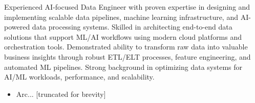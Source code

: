 \documentclass[10pt,a4paper,ragged2e,withhyper]{altacv}
\begin{document}
\makecvheader

\begin{minipage}{\textwidth}
Experienced AI-focused Data Engineer with proven expertise in designing and implementing scalable data pipelines, machine learning infrastructure, and AI-powered data processing systems. Skilled in architecting end-to-end data solutions that support ML/AI workflows using modern cloud platforms and orchestration tools. Demonstrated ability to transform raw data into valuable business insights through robust ETL/ELT processes, feature engineering, and automated ML pipelines. Strong background in optimizing data systems for AI/ML workloads, performance, and scalability.
\end{minipage}

\begin{itemize}[noitemsep]
\item Arc... [truncated for brevity]
\end{itemize}
\end{document}
